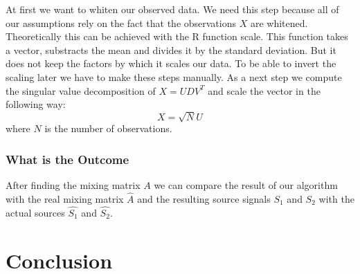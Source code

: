 \documentclass[12pt, a4paper]{article}
\numberwithin{equation}{section}
\numberwithin{figure}{section}
\numberwithin{table}{section}
\begin{document}
	At first we want to whiten our observed data.
	We need this step because all of our assumptions rely on the fact that the observations $X$ are whitened.
	Theoretically this can be achieved with the R function scale.
	This function takes a vector, substracts the mean and divides it by the standard deviation.
	But it does not keep the factors by which it scales our data.
	To be able to invert the scaling later we have to make these steps manually. %
	As a next step we compute the singular value decomposition of \mbox{$X=UDV^T$} and scale the vector in the following way:
	\begin{equation}
	X=\sqrt{N}U
	\end{equation}
	where $N$ is the number of observations.
	
	\subsubsection{What is the Outcome}
	After finding the mixing matrix $A$ we can compare the result of our algorithm with the real mixing matrix \mbox{$\hat{A}$} and the resulting source signals \mbox{$S_1$} and \mbox{$S_2$} with the actual sources \mbox{$\hat{S_1}$} and \mbox{$\hat{S_2}$}.
	
	\newpage
	\section {Conclusion}
	\newpage
	
	\thispagestyle{plain}
	
	
\end{document}
